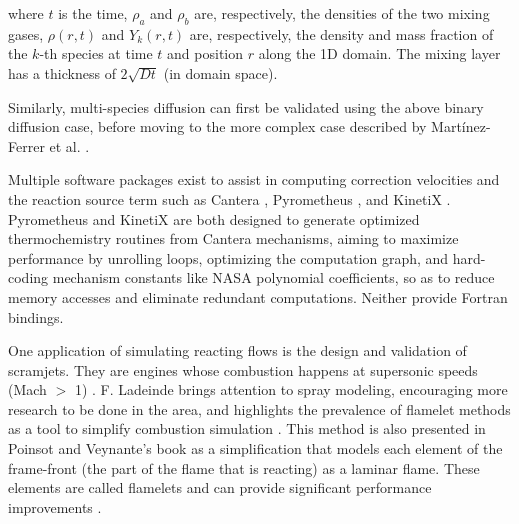 \noindent where $t$ is the time, $\rho_a$ and $\rho_b$ are, respectively, the
densities of the two mixing gases, $\rho\left(r,t\right)$ and $Y_k(r,t)$ are,
respectively, the density and mass fraction of the $k$-th species at time $t$
and position $r$ along the 1D domain. The mixing layer has a thickness of $2\sqrt{Dt}$
(in domain space).

Similarly, multi-species diffusion can first be validated using the above binary
diffusion case, before moving to the more complex case described by Martínez-Ferrer et al. \cite{MARTINEZFERRER201488}.

Multiple software packages exist to assist in computing correction velocities
and the reaction source term such as Cantera \cite{cantera}, Pyrometheus \cite{Pyrometheus2024},
and KinetiX \cite{danciu2024kinetixperformanceportablecode}. Pyrometheus and
KinetiX are both designed to generate optimized thermochemistry routines from
Cantera mechanisms, aiming to maximize performance by unrolling loops, optimizing
the computation graph, and hard-coding
mechanism constants like NASA polynomial coefficients, so as to reduce
memory accesses and eliminate redundant computations. Neither provide Fortran bindings.

One application of simulating reacting flows is the design and validation of scramjets.
They are engines whose combustion happens at supersonic speeds (Mach $>$ 1)
\cite{doi:10.2514/6.2009-127}. F. Ladeinde brings attention to spray modeling,
encouraging more research to be done in the area, and highlights the prevalence of
flamelet methods as a tool to simplify combustion simulation \cite{doi:10.2514/6.2009-127}.
This method is also presented in Poinsot and Veynante's book \cite{poinsot:hal-00270731}
as a simplification that models each element of the frame-front (the part of the flame
that is reacting) as a laminar flame. These elements are called flamelets and can
provide significant performance improvements \cite{poinsot:hal-00270731,doi:10.2514/6.2009-127}.
